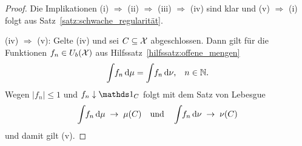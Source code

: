 \documentclass[../main/main.tex]{subfiles}
\begin{document}
	\begin{proof}
		Die Implikationen (i) $\Rightarrow$ (ii) $\Rightarrow$ (iii) $\Rightarrow$ (iv) sind klar und (v) 
		$\Rightarrow$ (i) folgt aus Satz~\ref{satz:schwache_regularität}.
		
		(iv) $\Rightarrow$ (v): Gelte (iv) und sei $C \subseteq \mathcal{X}$ abgeschlossen. 
		Dann gilt für die Funktionen $f_n \in U_b(\mathcal{X})$ aus Hilfssatz~\ref{hilfssatz:offene_mengen}
		$$\int_{} \, f_n \, \mathrm{d}\mu = \int_{} \, f_n \, \mathrm{d}\nu\text{,} \quad n \in \mathbb{N} \text{.}$$
		Wegen $| f_n | \leq 1$ und $f_n \convdown \indfct_C$ folgt mit dem Satz von Lebesgue 
		$$\int_{} \, f_n \, \mathrm{d}\mu \; \to \; \mu(C) \quad \text{und} \quad \int_{} \, f_n \, \mathrm{d}\nu 
		\; \to \; \nu(C)$$
		und damit gilt (v).
	\end{proof}
	
\end{document}

